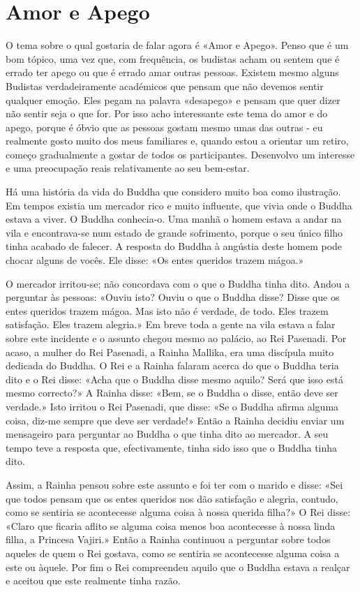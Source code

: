 \chapter{Amor e Apego}

O tema sobre o qual gostaria de falar agora é «Amor e Apego». Penso que
é um bom tópico, uma vez que, com frequência, os budistas acham ou
sentem que é errado ter apego ou que é errado amar outras pessoas.
Existem mesmo alguns Budistas verdadeiramente académicos que pensam que
não devemos sentir qualquer emoção. Eles pegam na palavra «desapego» e
pensam que quer dizer não sentir seja o que for. Por isso acho
interessante este tema do amor e do apego, porque é óbvio que as pessoas
gostam mesmo umas das outras - eu realmente gosto muito dos meus
familiares e, quando estou a orientar um retiro, começo gradualmente a
gostar de todos os participantes. Desenvolvo um interesse e uma
preocupação reais relativamente ao seu bem-estar.

Há uma história da vida do Buddha que considero muito boa como
ilustração. Em tempos existia um mercador rico e muito influente, que
vivia onde o Buddha estava a viver. O Buddha conhecia-o. Uma manhã o
homem estava a andar na vila e encontrava-se num estado de grande
sofrimento, porque o seu único filho tinha acabado de falecer. A
resposta do Buddha à angústia deste homem pode chocar alguns de vocês.
Ele disse: «Os entes queridos trazem mágoa.»

O mercador irritou-se; não concordava com o que o Buddha tinha dito.
Andou a perguntar às pessoas: «Ouviu isto? Ouviu o que o Buddha disse?
Disse que os entes queridos trazem mágoa. Mas isto não é verdade, de
todo. Eles trazem satisfação. Eles trazem alegria.» Em breve toda a
gente na vila estava a falar sobre este incidente e o assunto chegou
mesmo ao palácio, ao Rei Pasenadi. Por acaso, a mulher do Rei Pasenadi,
a Rainha Mallika, era uma discípula muito dedicada do Buddha. O Rei e a
Rainha falaram acerca do que o Buddha teria dito e o Rei disse: «Acha
que o Buddha disse mesmo aquilo? Será que isso está mesmo correcto?» A
Rainha disse: «Bem, se o Buddha o disse, então deve ser verdade.» Isto
irritou o Rei Pasenadi, que disse: «Se o Buddha afirma alguma coisa,
diz-me sempre que deve ser verdade!» Então a Rainha decidiu enviar um
mensageiro para perguntar ao Buddha o que tinha dito ao mercador. A seu
tempo teve a resposta que, efectivamente, tinha sido isso que o Buddha
tinha dito.

Assim, a Rainha pensou sobre este assunto e foi ter com o marido e
disse: «Sei que todos pensam que os entes queridos nos dão satisfação e
alegria, contudo, como se sentiria se acontecesse alguma coisa à nossa
querida filha?» O Rei disse: «Claro que ficaria aflito se alguma coisa
menos boa acontecesse à nossa linda filha, a Princesa Vajiri.» Então a
Rainha continuou a perguntar sobre todos aqueles de quem o Rei gostava,
como se sentiria se acontecesse alguma coisa a este ou àquele. Por fim o
Rei compreendeu aquilo que o Buddha estava a realçar e aceitou que este
realmente tinha razão.

